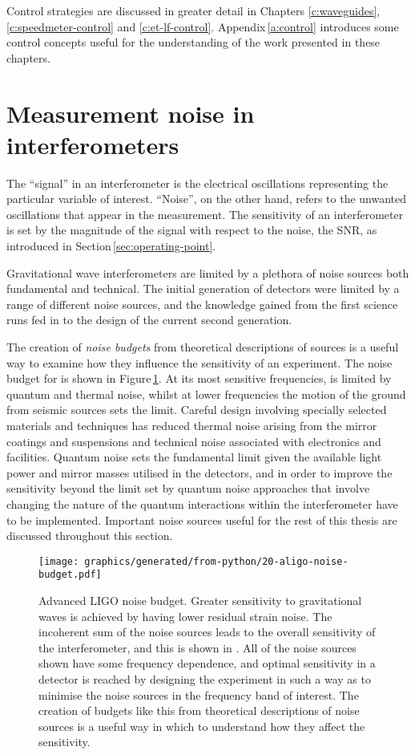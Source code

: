 Control strategies are discussed in greater detail in Chapters \ref{c:waveguides}, \ref{c:speedmeter-control} and \ref{c:et-lf-control}. Appendix\,\ref{a:control} introduces some control concepts useful for the understanding of the work presented in these chapters.

\section{\label{sec:ifo-noise}Measurement noise in interferometers}
The ``signal'' in an interferometer is the electrical oscillations representing the particular variable of interest. ``Noise'', on the other hand, refers to the unwanted oscillations that appear in the measurement. The sensitivity of an interferometer is set by the magnitude of the signal with respect to the noise, the \gls{SNR}, as introduced in Section\,\ref{sec:operating-point}.

Gravitational wave interferometers are limited by a plethora of noise sources both fundamental and technical. The initial generation of detectors were limited by a range of different noise sources, and the knowledge gained from the first science runs fed in to the design of the current second generation.

The creation of \emph{noise budgets} from theoretical descriptions of sources is a useful way to examine how they influence the sensitivity of an experiment. The noise budget for \ALIGO{} is shown in Figure\,\ref{fig:aligo-noise-budget}. At its most sensitive frequencies, \ALIGO{} is limited by quantum and thermal noise, whilst at lower frequencies the motion of the ground from seismic sources sets the limit. Careful design involving specially selected materials and techniques has reduced thermal noise arising from the mirror coatings and suspensions and technical noise associated with electronics and facilities. Quantum noise sets the fundamental limit given the available light power and mirror masses utilised in the detectors, and in order to improve the sensitivity beyond the limit set by quantum noise approaches that involve changing the nature of the quantum interactions within the interferometer have to be implemented. Important noise sources useful for the rest of this thesis are discussed throughout this section.

\begin{figure}
  \centering
  \texttt{[image: graphics/generated/from-python/20-aligo-noise-budget.pdf]}
  \caption[Advanced LIGO noise budget]{\label{fig:aligo-noise-budget}Advanced LIGO noise budget. Greater sensitivity to gravitational waves is achieved by having lower residual strain noise. The incoherent sum of the noise sources leads to the overall sensitivity of the interferometer, and this is shown in . All of the noise sources shown have some frequency dependence, and optimal sensitivity in a detector is reached by designing the experiment in such a way as to minimise the noise sources in the frequency band of interest. The creation of budgets like this from theoretical descriptions of noise sources is a useful way in which to understand how they affect the sensitivity.}
\end{figure}

